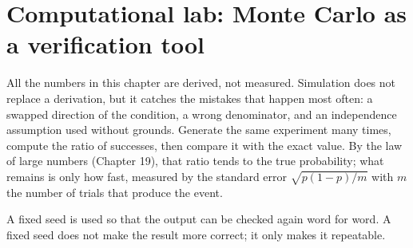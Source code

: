 
\section{Computational lab: Monte Carlo as a verification tool}

All the numbers in this chapter are derived, not measured. Simulation does not replace a
derivation, but it catches the mistakes that happen most often: a swapped direction of the
condition, a wrong denominator, and an independence assumption used without grounds.
Generate the same experiment many times, compute the ratio of successes, then compare it
with the exact value. By the law of large numbers (Chapter 19), that ratio tends to the true
probability; what remains is only how fast, measured by the standard error
$\sqrt{p(1-p)/m}$ with $m$ the number of trials that produce the event.


A fixed seed is used so that the output can be checked again word for word. A fixed seed
does not make the result more correct; it only makes it repeatable.

